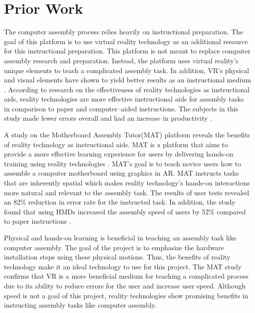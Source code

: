 \documentclass[10pt,twocolumn]{article}
\begin{document}
\section{Prior Work}

\par The computer assembly process relies heavily on instructional preparation. The goal of this platform is to use virtual reality technology as an additional resource for this instructional preparation. This platform is not meant to replace computer assembly research and preparation. Instead, the platform uses virtual reality’s unique elements to teach a complicated assembly task. In addition, VR’s physical and visual elements have shown to yield better results as an instructional medium \cite{Baird1999EvaluatingTheEffectiveness}. According to research on the effectiveness of reality technologies as instructional aids, reality technologies are more effective instructional aids for assembly tasks in comparison to paper and computer–aided instructions. The subjects in this study made fewer errors overall and had an increase in productivity \cite{Baird1999EvaluatingTheEffectiveness}. 

\par A study on the Motherboard Assembly Tutor(MAT) platform reveals the benefits of reality technology as instructional aids. MAT is a platform that aims to provide a more effective learning experience for users by delivering hands-on training using reality technologies \cite{Westerfield2015IntelligentAR}. MAT’s goal is to teach novice users how to assemble a computer motherboard using graphics in AR. MAT instructs tasks that are inherently spatial which makes reality technology’s hands-on interactions more natural and relevant to the assembly task. The results of user tests revealed an 82\% reduction in error rate for the instructed task. In addition, the study found that using HMDs increased the assembly speed of users by 52\% compared to paper instructions \cite{Westerfield2015IntelligentAR}. 

\par Physical and hands-on learning is beneficial in teaching an assembly task like computer assembly. The goal of the project is to emphasize the hardware installation steps using these physical motions. Thus, the benefits of reality technology make it an ideal technology to use for this project. The MAT study confirms that VR is a more beneficial medium for teaching a complicated process due to its ability to reduce errors for the user and increase user speed. Although speed is not a goal of this project, reality technologies show promising benefits in instructing assembly tasks like computer assembly. 
\end{document}
